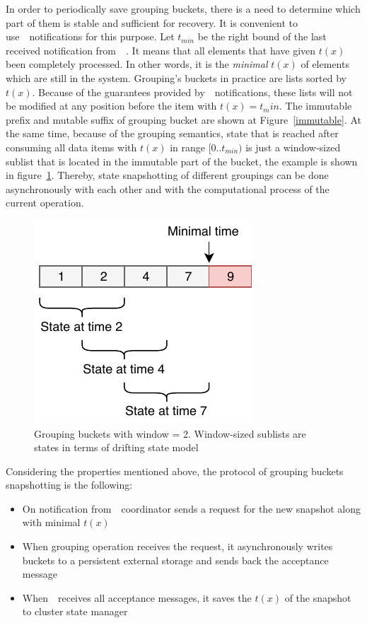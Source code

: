 In order to periodically save grouping buckets, there is a need to determine which part of them is stable and sufficient for recovery. It is convenient to use~\Acker\ notifications for this purpose. Let $t_{min}$ be the right bound of the last received notification from~\Acker\ . It means that all elements that have given $t(x)$ been completely processed. In other words, it is the {\em minimal} $t(x)$ of elements which are still in the system.  
Grouping's buckets in practice are lists sorted by $t(x)$. Because of the guarantees provided by~\Acker\ notifications, these lists will not be modified at any position before the item with $t(x)=t_min$. The immutable prefix and mutable suffix of grouping bucket are shown at Figure~\ref{immutable}. At the same time, because of the grouping semantics, state that is reached after consuming all data items with $t(x)$ in range $[0..t_{min})$ is just a window-sized sublist that is located in the immutable part of the bucket, the example is shown in figure~\ref{substate}. Thereby, state snapshotting of different groupings can be done asynchronously with each other and with the computational process of the current operation. 

\begin{figure}[htbp]
  \centering
  \includegraphics[width=0.5\columnwidth]{pics/substate}
  \caption{Grouping buckets with window = 2. Window-sized sublists are states in terms of drifting state model}
  \label {substate}
\end{figure}

Considering the properties mentioned above, the protocol of grouping buckets snapshotting is the following:

\begin{itemize}
    \item On notification from~\Acker\, coordinator sends a request for the new snapshot along with minimal $t(x)$
    \item When grouping operation receives the request, it asynchronously writes buckets to a persistent external storage and sends back the acceptance message
    \item When~\Acker\ receives all acceptance messages, it saves the $t(x)$ of the snapshot to cluster state manager
\end{itemize}

